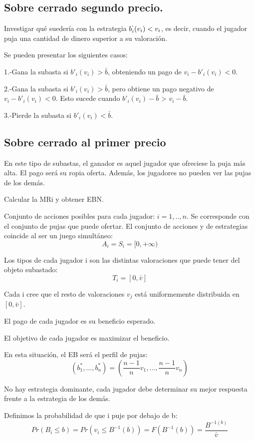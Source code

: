 \documentclass{article}
\begin{document}
\subsection{Sobre cerrado segundo precio.}
Investigar qu\'e sueder\'ia con la estrategia $b_i^`(v_i)<v_i$, es decir, cuando el jugador puja una cantidad de dinero superior a su valoraci\'on.

Se pueden presentar los siguientes casos:

1.-Gana la subasta si $b'_i(v_i)>\bar{b}$, obteniendo un pago de $v_i-b'_i(v_i)<0$.

2.-Gana la subasta si $b'_i(v_i)>\bar{b}$, pero obtiene un pago negativo de $v_i-b'_i(v_i)<0$. Esto sucede cuando $b'_i(v_i)-\bar{b}$ > $v_i-\bar{b}$.

3.-Pierde la subasta si $b'_i(v_i)<\bar{b}$.

\subsection{Sobre cerrado al primer precio}

En este tipo de subastas, el ganador es aquel jugador que ofreciese la puja m\'as alta. El pago ser\'a su ropia oferta. Adem\'as, los jugadores no pueden ver las pujas de los dem\'as.

Calcular la MRi y obtener EBN.

Conjunto de acciones posibles para cada jugador: $i=1,..,n$. Se corresponde con el conjunto de pujas que puede ofertar.
El conjunto de acciones y de estrategias coincide al ser un juego simult\'aneo:
$$A_i=S_i=[0,+\infty)$$

Los tipos de cada jugador i son las distintas valoraciones que puede tener del objeto subastado:
$$T_i=[0,\bar{v}]$$

Cada i cree que el resto de valoraciones $v_j$ est\'a uniformemente distribuida en $[0,\bar{v}]$.

El pago de cada jugador es su beneficio esperado.

El objetivo de cada jugador es maximizar el beneficio.

En esta situaci\'on, el EB ser\'a el perfil de pujas:
$${(b_1^*,...,b_n^*)}={(\frac{n-1}{n}v_1,...,\frac{n-1}{n}v_n)}$$

No hay estrategia dominante, cada jugador debe determinar su mejor respuesta frente a la estrategia de los dem\'as.

Definimos la probabilidad de que i puje por debajo de b:
$$Pr(B_i\leq b)=Pr(v_i\leq B^{-1}(b))=F(B^{-1}(b))=\frac{B^{-1(b)}}{\bar{v}}$$
\end{document}
